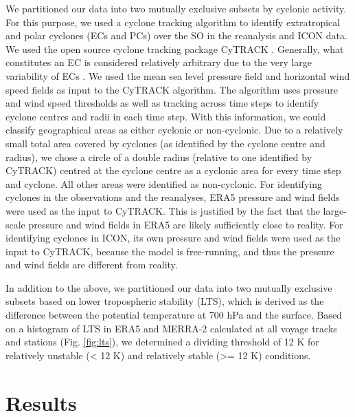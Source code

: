 \documentclass[12pt,a4paper]{article}
\begin{document}
We partitioned our data into two mutually exclusive subsets by cyclonic
activity. For this purpose, we used a cyclone tracking algorithm to identify
extratropical and polar cyclones (ECs and PCs) over the SO in the reanalysis
and ICON data. We used the open source cyclone tracking package CyTRACK
\citep{perez-alarcon2024}.  Generally, what constitutes an EC is considered
relatively arbitrary due to the very large variability of ECs \citep{neu2013}.
We used the mean sea level pressure field and horizontal wind speed fields as
input to the CyTRACK algorithm. The algorithm uses pressure and wind speed
thresholds as well as tracking across time steps to identify cyclone centres
and radii in each time step. With this information, we could classify geographical areas as
either cyclonic or non-cyclonic. Due to a relatively small total area covered by cyclones (as identified by the cyclone centre and radius),
we chose a circle of a double radius (relative to one identified by CyTRACK)
centred at the cyclone centre as a cyclonic area for every time step and
cyclone. All other areas were identified as non-cyclonic. For identifying
cyclones in the observations and the reanalyses, ERA5 pressure and wind fields
were used as the input to CyTRACK.  This is justified by the fact that the
large-scale pressure and wind fields in ERA5 are likely sufficiently close to
reality. For identifying cyclones in ICON, its own pressure and wind fields
were used as the input to CyTRACK, because the model is free-running, and thus
the pressure and wind fields are different from reality.

In addition to the above, we partitioned our data into two mutually exclusive
subsets based on lower tropospheric stability (LTS), which is derived as the difference between the potential temperature at 700 hPa
and the surface.  Based on a histogram of LTS in ERA5 and MERRA-2 calculated at
all voyage tracks and stations (Fig.  \ref{fig:lts}), we determined a dividing
threshold of 12 K for relatively unstable (< 12 K) and relatively stable (>= 12
K) conditions.

\section{Results}
\label{sec:results}
\end{document}
